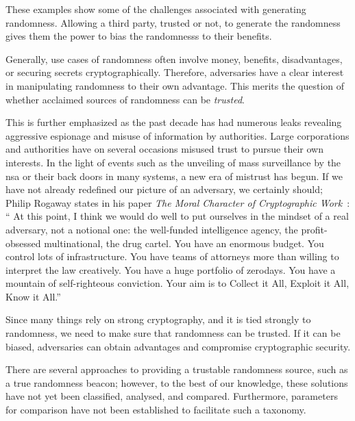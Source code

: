 These examples show some of the challenges associated with generating randomness. Allowing a third party, trusted or not, to generate the randomness gives them the power to bias the randomnesss to their benefits. 

Generally, use cases of randomness often involve money, benefits, disadvantages, or securing secrets cryptographically. Therefore, adversaries have a clear interest in manipulating randomness to their own advantage.
This merits the question of whether acclaimed sources of randomness can be \emph{trusted}.

This is further emphasized as the past decade has had numerous leaks revealing aggressive espionage and misuse of information by authorities.
Large corporations and authorities have on several occasions misused trust to pursue their own interests.
In the light of events such as the unveiling of mass surveillance by the \gls{nsa} or their back doors in many systems, a new era of mistrust has begun.
If we have not already redefined our picture of an adversary, we certainly should;
Philip Rogaway states in his paper \textit{The Moral Character of Cryptographic Work}~\cite{rogaway2015moral}:
\enquote{%
    At this point, I think we would do well to put ourselves in the mindset of a real adversary, not a notional one:
    the well-funded intelligence agency, the profit-obsessed multinational, the drug cartel.
    You have an enormous budget. You control lots of infrastructure.
    You have teams of attorneys more than willing to interpret the law creatively.
    You have a huge portfolio of zerodays. You have a mountain of self-righteous conviction.
    Your aim is to Collect it All, Exploit it All, Know it All.}%


Since many things rely on strong cryptography, and it is tied strongly to randomness, we need to make sure that randomness can be trusted. If it can be biased, adversaries can obtain advantages and compromise cryptographic security. 

There are several approaches to providing a trustable randomness source, such as a true randomness beacon; however, to the best of our knowledge, these solutions have not yet been classified, analysed, and compared.
Furthermore, parameters for comparison have not been established to facilitate such a taxonomy.


